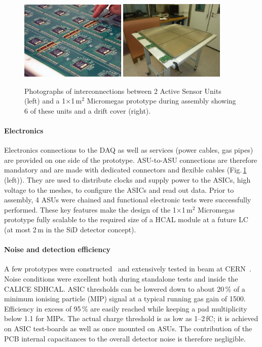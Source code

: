 \begin{figure}
\begin{centering}
\includegraphics[width=0.45\textwidth]{Calorimeter/SDHCAL/intercon}
\includegraphics[width=0.45\textwidth]{Calorimeter/SDHCAL/m2_assembly}
\caption{Photographs of interconnections between 2 Active Sensor Units (left) and a 1$\times$1\,m$^{2}$ Micromegas prototype during assembly showing 6 of these units and a drift cover (right).}
\label{mecha_elec}
\end{centering}
\end{figure}


\paragraph{Electronics}
Electronics connections to the DAQ as well as services (power cables, gas pipes) are provided on one side of the prototype. ASU-to-ASU connections are therefore mandatory and are made with dedicated connectors and flexible cables (Fig.\,\ref{mecha_elec} (left)). They are used to distribute clocks and supply power to the ASICs, high voltage to the meshes, to configure the ASICs and read out data. Prior to assembly, 4 ASUs were chained and functional electronic tests were successfully performed. These key features make the design of the 1$\times$1\,m$^{2}$ Micromegas prototype fully scalable to the required size of a HCAL module at a future LC (at most 2\,m in the SiD detector concept).

\paragraph{Noise and detection efficiency}
A few prototypes were constructed~\cite{Adloff201390} and extensively tested in beam at CERN~\cite{Adloff:2014qea}. Noise conditions were excellent both during standalone tests and inside the CALICE SDHCAL. ASIC thresholds can be lowered down to about 20\,\% of a minimum ionising particle (MIP) signal at a typical running gas gain of 1500. Efficiency in excess of 95\,\% are easily reached while keeping a pad multiplicity below 1.1 for MIPs. The actual charge threshold is as low as 1--2\,fC; it is achieved on ASIC test-boards as well as once mounted on ASUs. The contribution of the PCB internal capacitances to the overall detector noise is therefore negligible.

